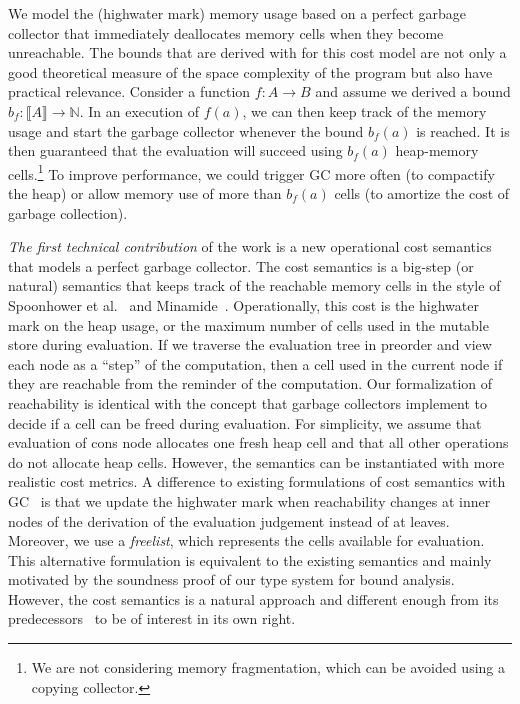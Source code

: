 \documentclass{easychair}
\newcommand{\denote}[1]{\llbracket#1\rrbracket}
\theoremstyle{definition}
\begin{document}
We model the (highwater mark) memory
usage based on a perfect garbage collector that immediately
deallocates memory cells when they become unreachable. The bounds that
are derived with for this cost model are not only a good theoretical
measure of the space complexity of the program but also have practical
relevance. Consider a function $f : A \to B$ and assume we derived a
bound $b_f : \denote{A} \to \mathbb{N}$. In an execution of $f(a)$, we
can then keep track of the memory usage and start the garbage
collector whenever the bound $b_f(a)$ is reached. It is then
guaranteed that the evaluation will succeed using $b_f(a)$ heap-memory
cells.\footnote{We are not considering memory fragmentation, which
  can be avoided using a copying collector.} To improve performance,
we could trigger GC more often (to compactify the heap) 
or allow memory use of more than $b_f(a)$ cells 
(to amortize the cost of garbage collection).

\emph{The first technical contribution} of the work is a new
operational cost semantics that models a perfect garbage collector.
%
The cost semantics is a big-step (or natural) semantics that keeps
track of the reachable memory cells in the style of Spoonhower et
al.~\cite{Spoonhower:2008:SPP:1411204.1411240} and
Minamide~\cite{DBLP:journals/entcs/Minamide99}. Operationally, this
cost is the highwater mark on the heap usage, or the maximum number of
cells used in the mutable store during evaluation. If we traverse the 
evaluation tree in preorder and view each node as a ``step'' 
of the computation, then a cell used in the current node
if they are reachable from the reminder of the
computation. Our formalization of reachability is identical with the
concept that garbage collectors implement to decide if a cell can be
freed during evaluation. For simplicity, we assume that evaluation of
cons node allocates one fresh heap cell and that all other
operations do not allocate heap cells. However, the semantics can be
instantiated with more realistic cost metrics. A difference to
existing formulations of cost semantics with
GC~\cite{Spoonhower:2008:SPP:1411204.1411240,DBLP:journals/entcs/Minamide99}
is that we update the highwater mark when reachability changes at
inner nodes of the derivation of the evaluation judgement instead of at
leaves. Moreover, we use a \emph{freelist}, which represents the
cells available for evaluation. This alternative formulation is
equivalent to the existing semantics and mainly motivated by the
soundness proof of our type system for bound analysis.  However, the
cost semantics is a natural approach and different enough from its
predecessors~\cite{Spoonhower:2008:SPP:1411204.1411240,DBLP:journals/entcs/Minamide99}
to be of interest in its own right.
\end{document}
